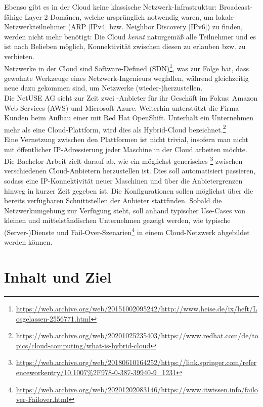 Ebenso gibt es in der Cloud keine klassische Netzwerk-Infrastruktur: Broadcast-fähige Layer-2-Domänen, welche ursprünglich notwendig waren, um lokale Netzwerkteilnehmer (ARP [IPv4] bzw. Neighbor Discovery [IPv6]) zu finden, werden nicht mehr benötigt: Die Cloud \textit{kennt} naturgemäß alle Teilnehmer und es ist nach Belieben möglich, Konnektivität zwischen diesen zu erlauben bzw. zu verbieten.\\
Netzwerke in der Cloud sind Software-Defined (SDN)\footnote{\url{https://web.archive.org/web/20151002095242/http://www.heise.de/ix/heft/Losgelassen-2556771.html}}, was zur Folge hat, dass gewohnte Werkzeuge eines Netzwerk-Ingenieurs wegfallen, während gleichzeitig neue dazu gekommen sind, um Netzwerke (wieder-)herzustellen.\\
Die NetUSE AG sieht zur Zeit zwei -Anbieter für ihr Geschäft im Fokus: Amazon Web Services (AWS) und Microsoft Azure. Weiterhin unterstützt die Firma Kunden beim Aufbau einer \grqq{} mit Red Hat OpenShift. Unterhält ein Unternehmen mehr als eine Cloud-Plattform, wird dies als Hybrid-Cloud bezeichnet.\footnote{\url{https://web.archive.org/web/20201025235403/https://www.redhat.com/de/topics/cloud-computing/what-is-hybrid-cloud}}\\
Eine Vernetzung zwischen den Plattformen ist nicht trivial, insofern man nicht mit öffentlicher IP-Adressierung jeder Maschine in der Cloud arbeiten möchte.
Die Bachelor-Arbeit zielt darauf ab, wie ein möglichst generisches \footnote{\url{https://web.archive.org/web/20180610164252/https://link.springer.com/referenceworkentry/10.1007\%2F978-0-387-39940-9\_1231}} zwischen verschiedenen Cloud-Anbietern herzustellen ist. Dies soll automatisiert passieren, sodass eine IP-Konnektivität neuer Maschinen und \grqq{} über die Anbietergrenzen hinweg in kurzer Zeit gegeben ist. Die Konfigurationen sollen möglichst über die bereits verfügbaren Schnittstellen der Anbieter stattfinden. Sobald die Netzwerkumgebung zur Verfügung steht, soll anhand typischer Use-Cases von kleinen und mittelständischen Unternehmen gezeigt werden, wie typische (Server-)Dienste und Fail-Over-Szenarien\footnote{\url{https://web.archive.org/web/20201202083146/https://www.itwissen.info/failover-Failover.html}} in einem Cloud-Netzwerk abgebildet werden können.

\chapter{Inhalt und Ziel}
